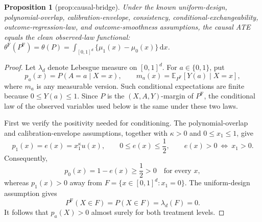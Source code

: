 \documentclass{article}
\newtheorem{proposition}{Proposition}
\begin{document}
\begin{proposition}[prop:causal-bridge]\label{prop:causal-bridge}
Under the known uniform-design, polynomial-overlap, calibration-envelope, consistency, conditional-exchangeability, outcome-regression-law, and outcome-smoothness assumptions, the causal ATE equals the clean observed-law functional: \(\theta^{\mathrm F}(P^{\mathrm F})=\theta(P)=\int_{[0,1]^d}\{\mu_1(x)-\mu_0(x)\}\,\mathrm dx\).
\end{proposition}
\begin{proof}
Let \(\lambda_d\) denote Lebesgue measure on \([0,1]^d\).  For
\(a\in\{0,1\}\), put
\[
p_a(x)=P(A=a\mid X=x),
\qquad
m_a(x)=\mathbb E_{P^{\mathrm F}}[Y(a)\mid X=x],
\]
where \(m_a\) is any measurable version.  Such conditional expectations are
finite because \(0\leq Y(a)\leq1\).  Since \(P\) is the
\((X,A,Y)\)-margin of \(P^{\mathrm F}\), the conditional law of the observed
variables used below is the same under these two laws.

First we verify the positivity needed for conditioning.  The polynomial-overlap
and calibration-envelope assumptions, together with \(\kappa>0\) and
\(0\leq x_1\leq1\), give
\[
p_1(x)=e(x)=x_1^\kappa u(x),
\qquad
0\leq e(x)\leq\frac12,
\qquad
e(x)>0\ \Longleftrightarrow\ x_1>0.
\]
Consequently,
\[
p_0(x)=1-e(x)\geq\frac12>0
\quad\text{for every }x,
\]
whereas \(p_1(x)>0\) away from
\(F=\{x\in[0,1]^d:x_1=0\}\).  The uniform-design assumption gives
\[
P^{\mathrm F}(X\in F)=P(X\in F)=\lambda_d(F)=0.
\]
It follows that \(p_a(X)>0\) almost surely for both treatment levels.


\end{proof}
\end{document}
